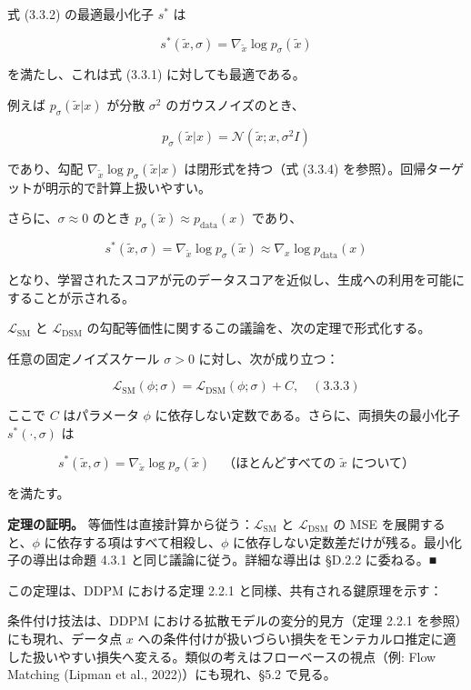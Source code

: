 式 (3.3.2) の最適最小化子 $s^*$ は

\[
s^*(\tilde{x},\sigma)=\nabla_{\tilde{x}}\log p_\sigma(\tilde{x})
\]


を満たし、これは式 (3.3.1) に対しても最適である。

例えば $p_\sigma(\tilde{x}|x)$ が分散 $\sigma^2$ のガウスノイズのとき、

\[
p_\sigma(\tilde{x}|x)=\mathcal{N}(\tilde{x};x,\sigma^2 I)
\]


であり、勾配 $\nabla_{\tilde{x}}\log p_\sigma(\tilde{x}|x)$ は閉形式を持つ（式 (3.3.4) を参照）。回帰ターゲットが明示的で計算上扱いやすい。

さらに、$\sigma\approx 0$ のとき $p_\sigma(\tilde{x})\approx p_{\mathrm{data}}(x)$ であり、

\[
s^*(\tilde{x},\sigma)=\nabla_{\tilde{x}}\log p_\sigma(\tilde{x})\approx\nabla_x\log p_{\mathrm{data}}(x)
\]


となり、学習されたスコアが元のデータスコアを近似し、生成への利用を可能にすることが示される。

$\mathcal{L}_{\mathrm{SM}}$ と $\mathcal{L}_{\mathrm{DSM}}$ の勾配等価性に関するこの議論を、次の定理で形式化する。

\begin{propositionbox}
任意の固定ノイズスケール $\sigma>0$ に対し、次が成り立つ：

\[
\mathcal{L}_{\mathrm{SM}}(\phi;\sigma)=\mathcal{L}_{\mathrm{DSM}}(\phi;\sigma)+C,
\quad (3.3.3)
\]

ここで $C$ はパラメータ $\phi$ に依存しない定数である。さらに、両損失の最小化子 $s^*(\cdot,\sigma)$ は

\[
s^*(\tilde{x},\sigma)=\nabla_{\tilde{x}}\log p_\sigma(\tilde{x})
\quad\text{（ほとんどすべての $\tilde{x}$ について）}
\]

を満たす。
\end{propositionbox}


\textbf{定理の証明。} 等価性は直接計算から従う：$\mathcal{L}_{\mathrm{SM}}$ と $\mathcal{L}_{\mathrm{DSM}}$ の MSE を展開すると、$\phi$ に依存する項はすべて相殺し、$\phi$ に依存しない定数差だけが残る。最小化子の導出は命題 4.3.1 と同じ議論に従う。詳細な導出は §D.2.2 に委ねる。■

この定理は、DDPM における定理 2.2.1 と同様、共有される鍵原理を示す：

\begin{propositionbox}[洞察 3.3.1（条件付け技法）]
条件付け技法は、DDPM における拡散モデルの変分的見方（定理 2.2.1 を参照）にも現れ、データ点 $x$ への条件付けが扱いづらい損失をモンテカルロ推定に適した扱いやすい損失へ変える。類似の考えはフローベースの視点（例: Flow Matching (Lipman et al., 2022)）にも現れ、§5.2 で見る。
\end{propositionbox}


